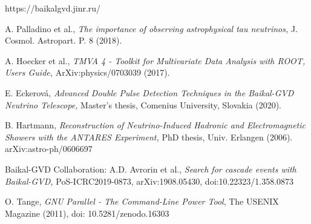 \documentclass[a4paper,11pt]{article}
\begin{document}
\begin{thebibliography}{99}

 https://baikalgvd.jinr.ru/

 A. Palladino et al., \emph{The importance of observing astrophysical tau neutrinos,}
J. Cosmol. Astropart. P. 8 (2018).
	
 A. Hoecker et al., \emph{TMVA 4 - Toolkit for Multivariate Data Analysis with ROOT, Users Guide,} ArXiv:physics/0703039 (2017). 

 E. Eckerová, \emph{Advanced Double Pulse Detection Techniques in the Baikal-GVD Neutrino Telescope,} Master’s thesis, Comenius University, Slovakia (2020).

 B. Hartmann, \emph{Reconstruction of Neutrino-Induced Hadronic and Electromagnetic Showers with the ANTARES Experiment,} PhD thesis, Univ. Erlangen (2006). arXiv:astro-ph/0606697

 Baikal-GVD Collaboration: A.D. Avrorin et al., \emph{Search for cascade events with Baikal-GVD,} PoS-ICRC2019-0873, arXiv:1908.05430, doi:10.22323/1.358.0873

 O. Tange, \emph{GNU Parallel - The Command-Line Power Tool}, The USENIX Magazine (2011), doi: 10.5281/zenodo.16303


\end{thebibliography}
\end{document}
